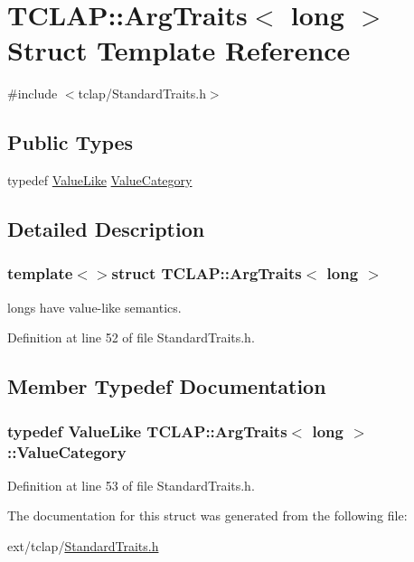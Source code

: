 \hypertarget{struct_t_c_l_a_p_1_1_arg_traits_3_01long_01_4}{}\section{T\+C\+L\+A\+P\+:\+:Arg\+Traits$<$ long $>$ Struct Template Reference}
\label{struct_t_c_l_a_p_1_1_arg_traits_3_01long_01_4}


{\ttfamily \#include $<$tclap/\+Standard\+Traits.\+h$>$}

\subsection*{Public Types}
\begin{DoxyCompactItemize}
\item 
typedef \hyperlink{struct_t_c_l_a_p_1_1_value_like}{Value\+Like} \hyperlink{struct_t_c_l_a_p_1_1_arg_traits_3_01long_01_4_a942d9a1e813bc3f82b51a2dcedb7316d}{Value\+Category}
\end{DoxyCompactItemize}


\subsection{Detailed Description}
\subsubsection*{template$<$$>$struct T\+C\+L\+A\+P\+::\+Arg\+Traits$<$ long $>$}

longs have value-\/like semantics. 

Definition at line 52 of file Standard\+Traits.\+h.



\subsection{Member Typedef Documentation}
\hypertarget{struct_t_c_l_a_p_1_1_arg_traits_3_01long_01_4_a942d9a1e813bc3f82b51a2dcedb7316d}{}
\subsubsection[{Value\+Category}]{\setlength{\rightskip}{0pt plus 5cm}typedef {\bf Value\+Like} {\bf T\+C\+L\+A\+P\+::\+Arg\+Traits}$<$ long $>$\+::{\bf Value\+Category}}\label{struct_t_c_l_a_p_1_1_arg_traits_3_01long_01_4_a942d9a1e813bc3f82b51a2dcedb7316d}


Definition at line 53 of file Standard\+Traits.\+h.



The documentation for this struct was generated from the following file\+:\begin{DoxyCompactItemize}
\item 
ext/tclap/\hyperlink{_standard_traits_8h}{Standard\+Traits.\+h}\end{DoxyCompactItemize}
